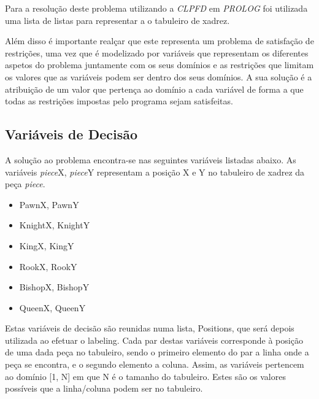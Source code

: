 \documentclass[runningheads]{llncs}
\begin{document}
Para a resolução deste problema utilizando a \emph{CLPFD} em \emph{PROLOG} foi utilizada uma lista de listas para representar a
o tabuleiro de xadrez.

Além disso é importante realçar que este representa um problema de satisfação de restrições, uma vez que é modelizado por variáveis que
representam os diferentes aspetos do problema juntamente com os seus domínios e as restrições que limitam os valores que as variáveis 
podem ser dentro dos seus domínios. A sua solução é a atribuição de um valor que pertença ao domínio a cada variável de forma a que todas 
as restrições impostas pelo programa sejam satisfeitas.

\subsection{Variáveis de Decisão}
    A solução ao problema encontra-se nas seguintes variáveis listadas abaixo. As variáveis \emph{piece}X, \emph{piece}Y 
    representam a posição X e Y no tabuleiro de xadrez da peça \emph{piece}.
    
    \begin{itemize}
        \item PawnX, PawnY
        \item KnightX, KnightY
        \item KingX, KingY
        \item RookX, RookY
        \item BishopX, BishopY
        \item QueenX, QueenY
    \end{itemize}
    
    Estas variáveis de decisão são reunidas numa lista, Positions, que será depois utilizada ao efetuar o labeling.
    Cada par destas variáveis corresponde à posição de uma dada peça no tabuleiro, sendo o primeiro elemento do par a linha onde a peça se encontra, e o segundo elemento a coluna.
    Assim, as variáveis pertencem ao domínio [1, N] em que N é o tamanho do tabuleiro. Estes são os valores possíveis que a linha/coluna podem ser no tabuleiro.
    
\end{document}
